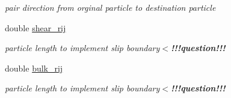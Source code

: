 \begin{CompactItemize}
\begin{CompactList}\small\item\em pair direction from orginal particle to destination particle \item\end{CompactList}\item 
\hypertarget{classInteraction_cb951c6ab7ba28c54b6c03f9dcda6d2b}{
double \hyperlink{classInteraction_cb951c6ab7ba28c54b6c03f9dcda6d2b}{shear\_\-rij}}
\label{classInteraction_cb951c6ab7ba28c54b6c03f9dcda6d2b}

\begin{CompactList}\small\item\em particle length to implement slip boundary$<${\bf !!!question!!!{\bf  }}\item\end{CompactList}\item 
\hypertarget{classInteraction_6e7625bfb7180e7ca9e9d113b16ac64e}{
double \hyperlink{classInteraction_6e7625bfb7180e7ca9e9d113b16ac64e}{bulk\_\-rij}}
\label{classInteraction_6e7625bfb7180e7ca9e9d113b16ac64e}

\begin{CompactList}\small\item\em particle length to implement slip boundary$<${\bf !!!question!!!{\bf  }}\item\end{CompactList}\end{CompactItemize}
